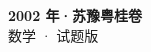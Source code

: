\documentclass[zihao=-4, a4paper]{ctexart}
\begin{document}
\begin{center}
  {\Large\bfseries 2002 年·苏豫粤桂卷}\\[4pt]
  {\large 数学 · 试题版}
\end{center}
\medskip
{}

\end{document}
